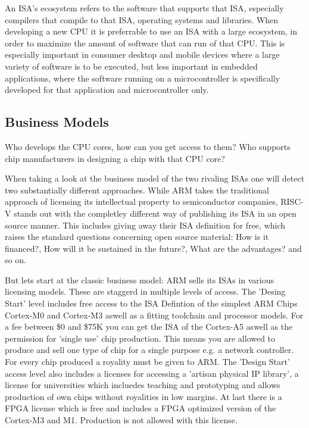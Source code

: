 \documentclass[conference]{IEEEtran}
\begin{document}
An \gls{ISA}'s ecosystem refers to the software that supports that \gls{ISA}, especially compilers that compile to that \gls{ISA}, operating systems and libraries.
When developing a new \gls{CPU} it is preferrable to use an \gls{ISA} with a large ecosystem, in order to maximize the amount of software
that can run of that \gls{CPU}. This is especially important in consumer desktop and mobile devices where a large variety of software is to be executed,
but less important in embedded applications, where the software running on a microcontroller is specifically developed for that application and microcontroller
only.

	\subsection{Business Models}
	Who develops the CPU cores, how can you get access to them? Who supports chip manufacturers in designing a chip with that CPU core?

	When taking a look at the business model of the two rivaling \glspl{ISA} one will detect two substantially different approaches. While ARM takes the traditional approach of licensing its intellectual property to semiconductor companies, RISC-V stands out with the completley different way of publishing its \gls{ISA} in an open source manner. This includes giving away their \gls{ISA} definition for free, which raises the standard questions concerning open source material: How is it financed?, How will it be sustained in the future?, What are the advantages? and so on.

	But lets start at the classic business model: ARM sells its \glspl{ISA} in various licensing models. \cite{ARMLC} These are staggerd in multiple levels of access. The 'Desing Start' level includes free access to the \gls{ISA} Defintion of the simplest ARM Chips Cortex-M0 and Cortex-M3 aswell as a fitting toolchain and processor models. For a fee between \$0 and \$75K you can get the \gls{ISA} of the Cortex-A5 aswell as the permission for 'single use' chip production. This means you are allowed to produce and sell one type of chip for a single purpose e.g. a network controller. For every chip produced a royality must be given to ARM. The 'Design Start' access level also includes a licenses for accessing a 'artisan physical IP library', a license for universities which incluedes teaching and prototyping and allows production of own chips without royalities in low margins. At last there is a \acrshort{FPGA} license which is free and includes a \gls{FPGA} optimized version of the Cortex-M3 and M1. Production is not allowed with this license.
\end{document}
